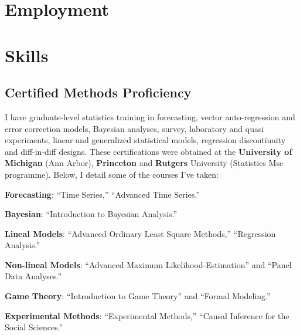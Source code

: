 \documentclass[letterpaper]{article}
\renewenvironment{itemize}{
  \begin{list}{}{
    \setlength{\leftmargin}{1.5em}
  }
}{
  \end{list}
}
\begin{document}
{\unskip}

\section*{Employment}

{\unskip}



\section*{Skills}


\subsection*{Certified Methods Proficiency}

I have graduate-level statistics training in forecasting, vector auto-regression and error correction models, Bayesian analyses, survey, laboratory and quasi experiments, linear and generalized statistical models, regression discontinuity and diff-in-diff designs. These certifications were obtained at the {\bf University of Michigan} (Ann Arbor), {\bf Princeton} and {\bf Rutgers} University (Statistics Msc programme). Below, I detail some of the courses I've taken:

\begin{itemize}
	\item[-] {\bf Forecasting}: ``Time Series,'' ``Advanced Time Series.''
	\item[-] {\bf Bayesian}: ``Introduction to Bayesian Analysis.'' 
	\item[-] {\bf Lineal Models}: ``Advanced Ordinary Least Square Methods,'' ``Regression Analysis.''
	\item[-] {\bf Non-lineal Models}: ``Advanced Maximum Likelihood-Estimation'' and ``Panel Data Analyses.''
	\item[-] {\bf Game Theory}: ``Introduction to Game Theory'' and ``Formal Modeling.''
	\item[-] {\bf Experimental Methods}: ``Experimental Methods,'' ``Causal Inference for the Social Sciences.''
\end{itemize}
\end{document}
